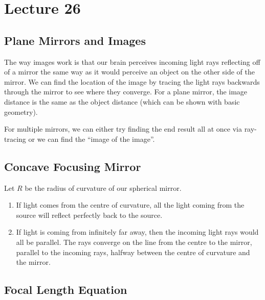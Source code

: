 \documentclass[class=article, crop=false]{standalone}
\begin{document}
  \section{Lecture 26}
  \subsection{Plane Mirrors and Images}
  The way images work is that our brain perceives incoming light rays reflecting off of a mirror the same way as it would perceive an object on the other side of the mirror. We can find the location of the image by tracing the light rays backwards through the mirror to see where they converge. For a plane mirror, the image distance is the same as the object distance (which can be shown with basic geometry). \par
  For multiple mirrors, we can either try finding the end result all at once via ray-tracing or we can find the ``image of the image''.
  \subsection{Concave Focusing Mirror}
  Let $R$ be the radius of curvature of our spherical mirror.
  \begin{enumerate}
    \item If light comes from the centre of curvature, all the light coming from the source will reflect perfectly back to the source.
    \item If light is coming from infinitely far away, then the incoming light rays would all be parallel. The rays converge on the line from the centre to the mirror, parallel to the incoming rays, halfway between the centre of curvature and the mirror.
  \end{enumerate}
  \subsection{Focal Length Equation}
\end{document}
